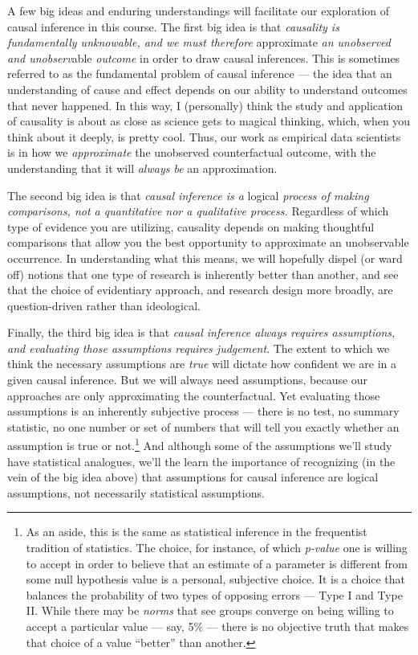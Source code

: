 \documentclass[12pt]{article}
\begin{document}
A few big ideas and enduring understandings will facilitate our exploration of causal inference in this course.  The first big idea is that \emph{causality is fundamentally unknowable, and we must therefore} approximate \emph{an unobserved and unobserv}able \emph{outcome} in order to draw causal inferences.  This is sometimes referred to as the fundamental problem of causal inference --- the idea that an understanding of cause and effect depends on our ability to understand outcomes that never happened.  In this way, I (personally) think the study and application of causality is about as close as science gets to magical thinking, which, when you think about it deeply, is pretty cool.  Thus, our work as empirical data scientists is in how we \emph{approximate} the unobserved counterfactual outcome, with the understanding that it will \emph{always be} an approximation.

The second big idea is that \emph{causal inference is a} logical \emph{process of making comparisons, not a quantitative nor a qualitative process.}  Regardless of which type of evidence you are utilizing, causality depends on making thoughtful comparisons that allow you the best opportunity to approximate an unobservable occurrence.  In understanding what this means, we will hopefully dispel (or ward off) notions that one type of research is inherently better than another, and see that the choice of evidentiary approach, and research design more broadly, are question-driven rather than ideological.

Finally, the third big idea is that \emph{causal inference always requires assumptions, and evaluating those assumptions requires judgement}.  The extent to which we think the necessary assumptions are \emph{true} will dictate how confident we are in a given causal inference.  But we will always need assumptions, because our approaches are only approximating the counterfactual.  Yet evaluating those assumptions is an inherently subjective process --- there is no test, no summary statistic, no one number or set of numbers that will tell you exactly whether an assumption is true or not.\footnote{\rmfamily As an aside, this is the same as statistical inference in the frequentist tradition of statistics.  The choice, for instance, of which \emph{p-value} one is willing to accept in order to believe that an estimate of a parameter is different from some null hypothesis value is a personal, subjective choice.  It is a choice that balances the probability of two types of opposing errors --- Type I and Type II.  While there may be \emph{norms} that see groups converge on being willing to accept a particular value --- say, 5\% --- there is no objective truth that makes that choice of a value ``better'' than another.}  And although some of the assumptions we'll study have statistical analogues, we'll the learn the importance of recognizing (in the vein of the big idea above) that assumptions for causal inference are logical assumptions, not necessarily statistical assumptions.
\end{document}
